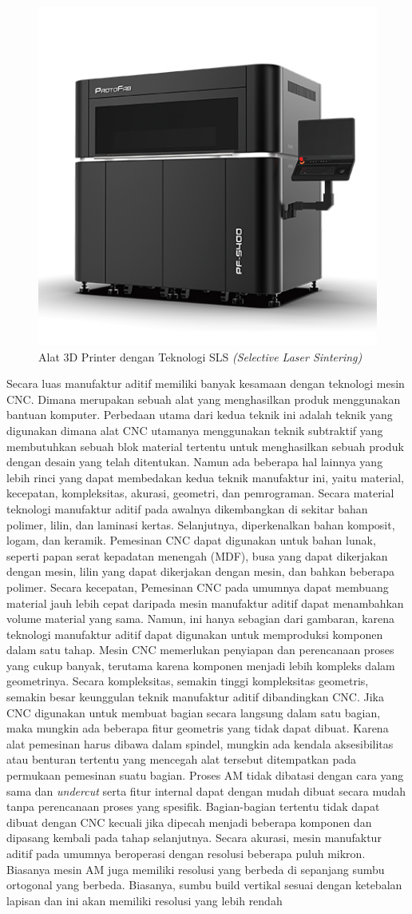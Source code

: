 \begin{figure}[H]
    \centering
    \includegraphics[width=0.3\linewidth]{gambar/sls-3d-printer.jpg}
    \caption{Alat 3D Printer dengan Teknologi SLS \textit{(Selective Laser Sintering)}}
    \label{fig:sls-3d-printer}
\end{figure}

Secara luas manufaktur aditif memiliki banyak kesamaan dengan teknologi mesin CNC. Dimana merupakan sebuah alat yang menghasilkan produk menggunakan bantuan komputer. Perbedaan utama dari kedua teknik ini adalah teknik yang digunakan dimana alat CNC utamanya menggunakan teknik subtraktif yang membutuhkan sebuah blok material tertentu untuk menghasilkan sebuah produk dengan desain yang telah ditentukan. Namun ada beberapa hal lainnya yang lebih rinci yang dapat membedakan kedua teknik manufaktur ini, yaitu material, kecepatan, kompleksitas, akurasi, geometri, dan pemrograman. Secara material teknologi manufaktur aditif pada awalnya dikembangkan di sekitar bahan polimer, lilin, dan laminasi kertas. Selanjutnya, diperkenalkan bahan komposit, logam, dan keramik. Pemesinan CNC dapat digunakan untuk bahan lunak, seperti papan serat kepadatan menengah (MDF), busa yang dapat dikerjakan dengan mesin, lilin yang dapat dikerjakan dengan mesin, dan bahkan beberapa polimer. Secara kecepatan, Pemesinan CNC pada umumnya dapat membuang material jauh lebih cepat daripada mesin manufaktur aditif dapat menambahkan volume material yang sama. Namun, ini hanya sebagian dari gambaran, karena teknologi manufaktur aditif dapat digunakan untuk memproduksi komponen dalam satu tahap. Mesin CNC memerlukan penyiapan dan perencanaan proses yang cukup banyak, terutama karena komponen menjadi lebih kompleks dalam geometrinya. Secara kompleksitas, semakin tinggi kompleksitas geometris, semakin besar keunggulan teknik manufaktur aditif dibandingkan CNC. Jika CNC digunakan untuk membuat bagian secara langsung dalam satu bagian, maka mungkin ada beberapa fitur geometris yang tidak dapat dibuat. Karena alat pemesinan harus dibawa dalam spindel, mungkin ada kendala aksesibilitas atau benturan tertentu yang mencegah alat tersebut ditempatkan pada permukaan pemesinan suatu bagian. Proses AM tidak dibatasi dengan cara yang sama dan \textit{undercut} serta fitur internal dapat dengan mudah dibuat secara mudah tanpa perencanaan proses yang spesifik. Bagian-bagian tertentu tidak dapat dibuat dengan CNC kecuali jika dipecah menjadi beberapa komponen dan dipasang kembali pada tahap selanjutnya. Secara akurasi, mesin manufaktur aditif pada umumnya beroperasi dengan resolusi beberapa puluh mikron. Biasanya mesin AM juga memiliki resolusi yang berbeda di sepanjang sumbu ortogonal yang berbeda. Biasanya, sumbu build vertikal sesuai dengan ketebalan lapisan dan ini akan memiliki resolusi yang lebih rendah 